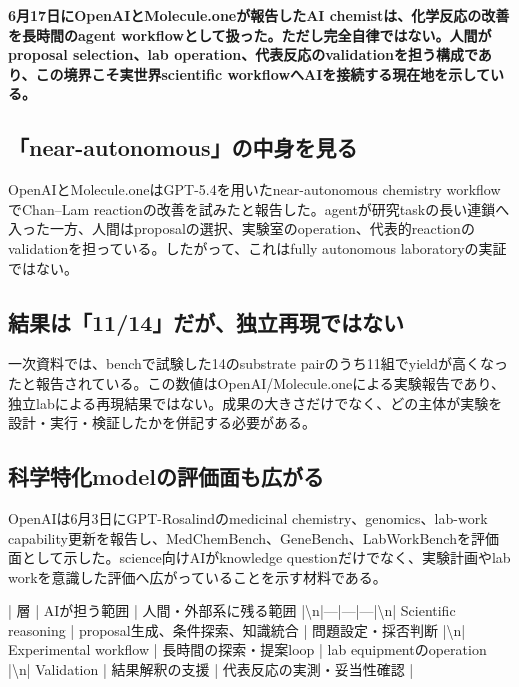 \noindent\textbf{6月17日にOpenAIとMolecule.oneが報告したAI chemistは、化学反応の改善を長時間のagent workflowとして扱った。ただし完全自律ではない。人間がproposal selection、lab operation、代表反応のvalidationを担う構成であり、この境界こそ実世界scientific workflowへAIを接続する現在地を示している。}\autocite{src-5ff2f715f1e6}

\subsection{「near-autonomous」の中身を見る}

OpenAIとMolecule.oneはGPT-5.4を用いたnear-autonomous chemistry workflowでChan–Lam reactionの改善を試みたと報告した。agentが研究taskの長い連鎖へ入った一方、人間はproposalの選択、実験室のoperation、代表的reactionのvalidationを担っている。したがって、これはfully autonomous laboratoryの実証ではない。\autocite{src-5ff2f715f1e6}


\subsection{結果は「11/14」だが、独立再現ではない}

一次資料では、benchで試験した14のsubstrate pairのうち11組でyieldが高くなったと報告されている。この数値はOpenAI/Molecule.oneによる実験報告であり、独立labによる再現結果ではない。成果の大きさだけでなく、どの主体が実験を設計・実行・検証したかを併記する必要がある。\autocite{src-5ff2f715f1e6}


\subsection{科学特化modelの評価面も広がる}

OpenAIは6月3日にGPT-Rosalindのmedicinal chemistry、genomics、lab-work capability更新を報告し、MedChemBench、GeneBench、LabWorkBenchを評価面として示した。science向けAIがknowledge questionだけでなく、実験計画やlab workを意識した評価へ広がっていることを示す材料である。\autocite{src-ba562226725d}


| 層 | AIが担う範囲 | 人間・外部系に残る範囲 |\textbackslash{}n|---|---|---|\textbackslash{}n| Scientific reasoning | proposal生成、条件探索、知識統合 | 問題設定・採否判断 |\textbackslash{}n| Experimental workflow | 長時間の探索・提案loop | lab equipmentのoperation |\textbackslash{}n| Validation | 結果解釈の支援 | 代表反応の実測・妥当性確認 |\autocite{src-5ff2f715f1e6,src-ba562226725d}

